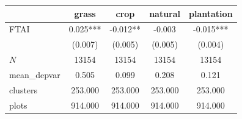 {
\def\sym#1{\ifmmode^{#1}\else\(^{#1}\)\fi}
\begin{tabular}{l*{4}{c}}
\toprule
          &\multicolumn{1}{c}{grass}&\multicolumn{1}{c}{crop}&\multicolumn{1}{c}{natural}&\multicolumn{1}{c}{plantation}\\
\midrule
FTAI      &    0.025***&   -0.012** &   -0.003   &   -0.015***\\
          &  (0.007)   &  (0.005)   &  (0.005)   &  (0.004)   \\
\midrule
\(N\)     &    13154   &    13154   &    13154   &    13154   \\
mean\_depvar&    0.505   &    0.099   &    0.208   &    0.121   \\
clusters  &  253.000   &  253.000   &  253.000   &  253.000   \\
plots     &  914.000   &  914.000   &  914.000   &  914.000   \\
\bottomrule
\end{tabular}
}
